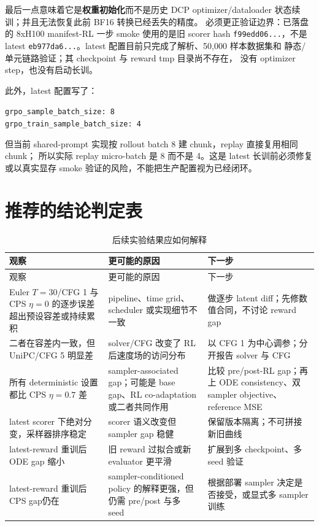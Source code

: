 \documentclass[11pt,a4paper]{article}
\newcommand{\code}[1]{\texttt{#1}}
\begin{document}
最后一点意味着它是\textbf{权重初始化}而不是历史 DCP optimizer/dataloader
状态续训；并且无法恢复此前 BF16 转换已经丢失的精度。
必须更正验证边界：已落盘的 8xH100 manifest-RL 一步 smoke
使用的是旧 scorer hash \code{f99edd06...}，不是 latest
\code{eb977da6...}。latest 配置目前只完成了解析、50,000 样本数据集和
静态/单元链路验证；其 checkpoint 与 reward tmp 目录尚不存在，
没有 optimizer step，也没有启动长训。

此外，latest 配置写了：
\begin{center}
  \code{grpo\_sample\_batch\_size: 8}\\
  \code{grpo\_train\_sample\_batch\_size: 4}
\end{center}
但当前 shared-prompt
实现按 rollout batch 8 建 chunk，replay 直接复用相同 chunk；
所以实际 replay micro-batch 是 8 而不是 4。这是 latest 长训前必须修复
或以真实显存 smoke 验证的风险，不能把生产配置视为已经闭环。

\section{推荐的结论判定表}

\begin{longtable}{p{4.1cm}p{5.4cm}p{5.4cm}}
  \caption{后续实验结果应如何解释}
  \label{tab:decision}\\
  \toprule
  观察 & 更可能的原因 & 下一步\\
  \midrule
  \endfirsthead
  \toprule
  观察 & 更可能的原因 & 下一步\\
  \midrule
  \endhead
  Euler $T=30$/CFG 1 与 CPS $\eta=0$ 的逐步误差超出预设容差或持续累积
    & pipeline、time grid、scheduler 或实现细节不一致
    & 做逐步 latent diff；先修数值合同，不讨论 reward gap\\
  \addlinespace
  二者在容差内一致，但 UniPC/CFG 5 明显差
    & solver/CFG 改变了 RL 后速度场的访问分布
    & 以 CFG 1 为中心调参；分开报告 solver 与 CFG\\
  \addlinespace
  所有 deterministic 设置都比 CPS $\eta=0.7$ 差
    & sampler-associated gap；可能是 base gap、RL co-adaptation 或二者共同作用
    & 比较 pre/post-RL gap；再上 ODE consistency、双 sampler objective、reference MSE\\
  \addlinespace
  latest scorer 下绝对分变，采样器排序稳定
    & scorer 语义改变但 sampler gap 稳健
    & 保留版本隔离；不可拼接新旧曲线\\
  \addlinespace
  latest-reward 重训后 ODE gap 缩小
    & 旧 reward 过拟合或新 evaluator 更平滑
    & 扩展到多 checkpoint、多 seed 验证\\
  \addlinespace
  latest-reward 重训后 CPS gap仍在
    & sampler-conditioned policy 的解释更强，但仍需 pre/post 与多 seed
    & 根据部署 sampler 决定是否接受，或显式多 sampler 训练\\
  \bottomrule
\end{longtable}
\end{document}
